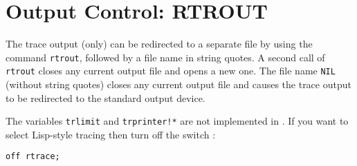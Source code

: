 \section{Output Control: RTROUT}

\hypertarget{command:RTROUT}{}
The trace output (only) can be redirected to a separate file by using
the command \texttt{rtrout}, followed by a file name in string quotes.
A second call of \texttt{rtrout} closes any current output file and
opens a new one.  The file name \texttt{NIL} (without string quotes)
closes any current output file and causes the trace output to be
redirected to the standard output device.

The \rdebug{} variables \texttt{trlimit} and \texttt{trprinter!*} are
not implemented in \rtrace{}.  If you want to select Lisp-style
tracing then turn off the switch \rtrace{}:
\begin{verbatim}
off rtrace;
\end{verbatim}

\endinput
after loading the \rtrace{} package.  Note that the \rtrace{} switch
controls the display format of both procedure and rule tracing.
